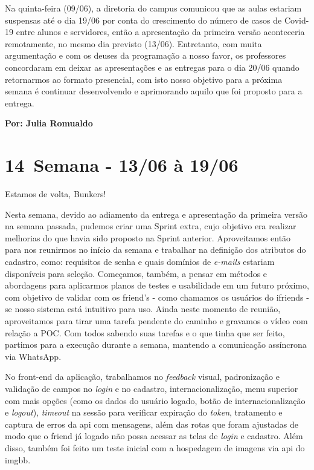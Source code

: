 Na quinta-feira (09/06), a diretoria do campus comunicou que as aulas estariam suspensas até o dia 19/06 por conta do crescimento do número de casos de Covid-19 entre alunos e servidores, então a apresentação da primeira versão aconteceria remotamente, no mesmo dia previsto (13/06). Entretanto, com muita argumentação e com os deuses da programação a nosso favor, os professores concordaram em deixar as apresentações e as entregas para o dia 20/06 quando retornarmos ao formato presencial, com isto nosso objetivo para a próxima semana é continuar desenvolvendo e aprimorando aquilo que foi proposto para a entrega. 

\textbf{Por: Julia Romualdo}

\section{14\textordfeminine \, Semana - 13/06 à 19/06}
Estamos de volta, Bunkers!

Nesta semana, devido ao adiamento da entrega e apresentação da primeira versão na semana passada, pudemos criar uma \gls{Sprint} extra, cujo objetivo era realizar melhorias do que havia sido proposto na \gls{Sprint} anterior. 
Aproveitamos então para nos reunirmos no início da semana e trabalhar na definição dos atributos do cadastro, como: requisitos de senha e quais domínios de \textit{e-mails} estariam disponíveis para seleção. Começamos, também, a pensar em métodos e abordagens para aplicarmos planos de testes e usabilidade em um futuro próximo, com objetivo de validar com os \gls{friend}'s - como chamamos os usuários do \gls{ifriends} - se nosso sistema está intuitivo para uso. Ainda neste momento de reunião, aproveitamos para tirar uma tarefa pendente do caminho e gravamos o vídeo com relação a \acs{POC}. 
Com todos sabendo suas tarefas e o que tinha que ser feito, partimos para a execução durante a semana, mantendo a comunicação assíncrona via \gls{WhatsApp}.

No \gls{front-end} da aplicação, trabalhamos no \textit{feedback} visual, padronização e validação de campos no \textit{login} e no cadastro, internacionalização, menu superior com mais opções (como os dados do usuário logado, botão de internacionalização e \textit{logout}), \textit{timeout} na sessão para verificar expiração do \textit{token}, tratamento e captura de erros da \acs{api} com mensagens, além das rotas que foram ajustadas de modo que o \gls{friend} já logado não possa acessar as telas de \textit{login} e cadastro. Além disso, também foi feito um teste inicial com a hospedagem de imagens via \acs{api} do \gls{imgbb}.

